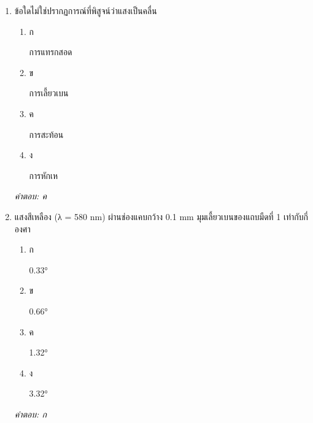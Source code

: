 \documentclass[12pt]{article}
\begin{document}
\begin{enumerate}[label=\arabic*., itemsep=0.5\baselineskip, topsep=0.5\baselineskip, leftmargin=*]
\item ข้อใดไม่ใช่ปรากฏการณ์ที่พิสูจน์ว่าแสงเป็นคลื่น
\begin{enumerate}[label=\alph*)., itemsep=0.3\baselineskip, topsep=0.3\baselineskip]
\item ก\ 
\begin{minipage}[t]{0.9\linewidth}
\raggedright การแทรกสอด
\end{minipage}
\item ข\ 
\begin{minipage}[t]{0.9\linewidth}
\raggedright การเลี้ยวเบน
\end{minipage}
\item ค\ 
\begin{minipage}[t]{0.9\linewidth}
\raggedright การสะท้อน
\end{minipage}
\item ง\ 
\begin{minipage}[t]{0.9\linewidth}
\raggedright การหักเห
\end{minipage}
\end{enumerate}
\vspace{-0.3\baselineskip}
\begin{small}
\textit{คำตอบ: ค}
\end{small}

\item แสงสีเหลือง (λ = 580 nm) ผ่านช่องแคบกว้าง 0.1 mm มุมเลี้ยวเบนของแถบมืดที่ 1 เท่ากับกี่องศา
\begin{enumerate}[label=\alph*)., itemsep=0.3\baselineskip, topsep=0.3\baselineskip]
\item ก\ 
\begin{minipage}[t]{0.9\linewidth}
\raggedright 0.33°
\end{minipage}
\item ข\ 
\begin{minipage}[t]{0.9\linewidth}
\raggedright 0.66°
\end{minipage}
\item ค\ 
\begin{minipage}[t]{0.9\linewidth}
\raggedright 1.32°
\end{minipage}
\item ง\ 
\begin{minipage}[t]{0.9\linewidth}
\raggedright 3.32°
\end{minipage}
\end{enumerate}
\vspace{-0.3\baselineskip}
\begin{small}
\textit{คำตอบ: ก}
\end{small}


\end{enumerate}
\end{document}
